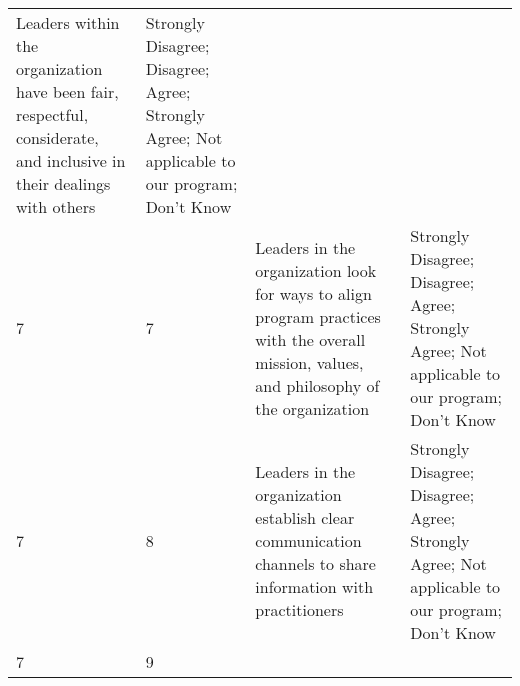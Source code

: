 \documentclass[]{article}
\begin{document}
\begin{longtable}[]{@{}llll@{}}
\begin{minipage}[t]{0.41\columnwidth}
Leaders within the organization have been fair, respectful, considerate,
and inclusive in their dealings with others\strut
\end{minipage} & \begin{minipage}[t]{0.39\columnwidth}\raggedright\strut
Strongly Disagree; Disagree; Agree; Strongly Agree; Not applicable to
our program; Don't Know\strut
\end{minipage}\tabularnewline
\begin{minipage}[t]{0.05\columnwidth}\raggedright\strut
7\strut
\end{minipage} & \begin{minipage}[t]{0.04\columnwidth}\raggedright\strut
7\strut
\end{minipage} & \begin{minipage}[t]{0.41\columnwidth}\raggedright\strut
Leaders in the organization look for ways to align program practices
with the overall mission, values, and philosophy of the
organization\strut
\end{minipage} & \begin{minipage}[t]{0.39\columnwidth}\raggedright\strut
Strongly Disagree; Disagree; Agree; Strongly Agree; Not applicable to
our program; Don't Know\strut
\end{minipage}\tabularnewline
\begin{minipage}[t]{0.05\columnwidth}\raggedright\strut
7\strut
\end{minipage} & \begin{minipage}[t]{0.04\columnwidth}\raggedright\strut
8\strut
\end{minipage} & \begin{minipage}[t]{0.41\columnwidth}\raggedright\strut
Leaders in the organization establish clear communication channels to
share information with practitioners\strut
\end{minipage} & \begin{minipage}[t]{0.39\columnwidth}\raggedright\strut
Strongly Disagree; Disagree; Agree; Strongly Agree; Not applicable to
our program; Don't Know\strut
\end{minipage}\tabularnewline
\begin{minipage}[t]{0.05\columnwidth}\raggedright\strut
7\strut
\end{minipage} & \begin{minipage}[t]{0.04\columnwidth}\raggedright\strut
9\strut
\end{minipage} & \begin{minipage}[t]{0.41\columnwidth}\raggedright\strut

\end{minipage}
\end{longtable}
\end{document}
